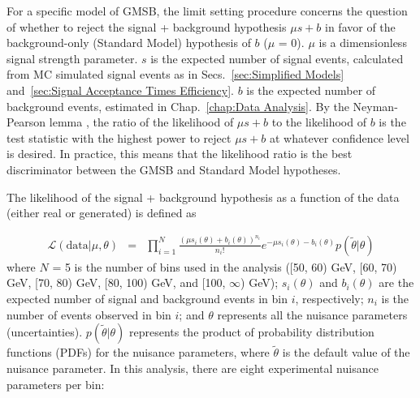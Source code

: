 \documentclass[dissertation.tex]{subfiles}
\begin{document}
For a specific model of GMSB, the limit setting procedure concerns the question of whether to reject the signal + background hypothesis $\mu s + b$ in favor of the background-only (Standard Model) hypothesis of $b$ ($\mu$ = 0).  $\mu$ is a dimensionless signal strength parameter.  $s$ is the expected number of signal events, calculated from MC simulated signal events as in Secs.~\ref{sec:Simplified Models} and~\ref{sec:Signal Acceptance Times Efficiency}.  $b$ is the expected number of background events, estimated in Chap.~\ref{chap:Data Analysis}.  By the Neyman-Pearson lemma \cite{Neyman_Pearson}, the ratio of the likelihood of $\mu s + b$ to the likelihood of $b$ is the test statistic with the highest power to reject $\mu s + b$ at whatever confidence level is desired.  In practice, this means that the likelihood ratio is the best discriminator between the GMSB and Standard Model hypotheses.

The likelihood of the signal + background hypothesis as a function of the data (either real or generated) is defined as 

\begin{eqnarray}
\label{eq:L_sb}
\mathcal{L}(\mbox{data} | \mu, \theta) &=& \prod_{i = 1}^{N} \frac{(\mu s_{i}(\theta) + b_{i}(\theta))^{n_{i}}}{n_{i}!}e^{-\mu s_{i}(\theta) - b_{i}(\theta)}p(\tilde{\theta} | \theta)
\end{eqnarray}
%
where $N$ = 5 is the number of \MET bins used in the analysis ([50, 60) GeV, [60, 70) GeV, [70, 80) GeV, [80, 100) GeV, and [100, $\infty$) GeV); $s_{i}(\theta)$ and $b_{i}(\theta)$ are the expected number of signal and background events in \MET bin $i$, respectively; $n_{i}$ is the number of events observed in \MET bin $i$; and $\theta$ represents all the nuisance parameters (uncertainties).  $p(\tilde{\theta} | \theta)$ represents the product of probability distribution functions (PDFs) for the nuisance parameters, where $\tilde{\theta}$ is the default value of the nuisance parameter.  In this analysis, there are eight experimental nuisance parameters per \MET bin:
\end{document}
